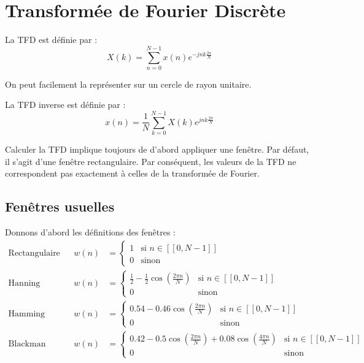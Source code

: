 \section{Transformée de Fourier Discrète}
    La TFD est définie par :
    $$
        X(k) = \sum_{n=0}^{N-1} x(n)e^{-jnk\frac{2\pi}{N}}
    $$

    On peut facilement la représenter sur un cercle de rayon unitaire.

    La TFD inverse est définie par :
    $$
        x(n) = \frac{1}{N}\sum_{k=0}^{N-1} X(k)e^{jnk\frac{2\pi}{N}}
    $$

    Calculer la TFD implique toujours de d'abord appliquer une fenêtre. Par défaut, il s'agit d'une fenêtre rectangulaire. Par conséquent, les valeurs de la TFD ne correspondent pas exactement à celles de la transformée de Fourier.

    \subsection{Fenêtres usuelles}\label{subsec:fenetres}
        Donnons d'abord les définitions des fenêtres :
        \begin{align*}
            \text{Rectangulaire} && w(n) &= \begin{cases}
                1 & \text{si } n \in [[0, N-1]] \\
                0 & \text{sinon}
            \end{cases}\\
            \text{Hanning} && w(n) &= \begin{cases}
                \frac{1}{2} - \frac{1}{2}\cos(\frac{2\pi n}{N}) & \text{si } n \in [[0, N-1]]\\
                0 & \text{sinon}
            \end{cases}\\
            \text{Hamming} && w(n) &= \begin{cases}
                0.54-0.46\cos(\frac{2\pi n}{N}) & \text{si } n \in [[0, N-1]]\\
                0 & \text{sinon}
            \end{cases}\\
            \text{Blackman} && w(n) &= \begin{cases}
                0.42-0.5\cos(\frac{2\pi n}{N})+0.08\cos(\frac{4\pi n}{N}) & \text{si } n \in [[0, N-1]]\\
                0 & \text{sinon}
            \end{cases}\\
        \end{align*}

